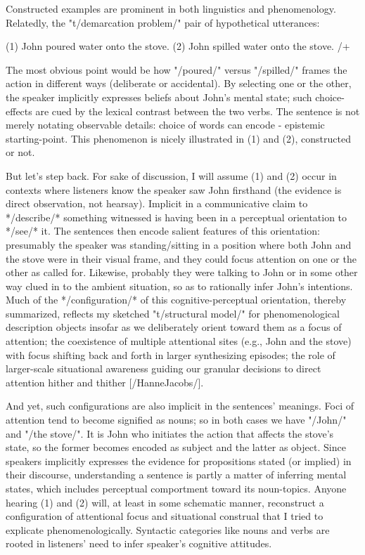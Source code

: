 Constructed examples are prominent in both linguistics 
and phenomenology.  Relatedly, the "t/demarcation problem/" 
pair of hypothetical utterances:

(1)  John poured water onto the stove.
(2)  John spilled water onto the stove.
/+

The most obvious point would be how "/poured/" versus "/spilled/" frames the 
action in different ways (deliberate or accidental).  By selecting 
one or the other, the speaker implicitly expresses beliefs about 
John's mental state; such choice-effects are cued by the lexical contrast 
between the two verbs.  The 
sentence is not merely notating observable details: choice of words can 
encode -%
epistemic starting-point.  This phenomenon 
is nicely illustrated in (1) and (2), constructed or not.  

But let's step back.  For sake of discussion, I will assume (1) and (2) 
occur in contexts where listeners know the speaker saw John firsthand 
(the evidence is direct observation, not hearsay).  Implicit 
in a communicative claim to */describe/* something witnessed 
is having been in a perceptual orientation to */see/* it.  The 
sentences then encode salient features of this orientation: 
presumably the speaker was standing/sitting in a position 
where both John and the stove were in their visual frame, 
and they could focus attention on one or the other as 
called for.  Likewise, probably they were talking to 
John or in some other way clued in to the ambient situation, so 
as to rationally infer John's intentions.  Much of the 
*/configuration/* of this cognitive-perceptual orientation, 
thereby summarized, reflects my sketched "t/structural model/" 
for phenomenological description %
objects insofar as we deliberately orient toward them 
as a focus of attention; the coexistence of multiple 
attentional sites (e.g., John and the stove) with focus 
shifting back and forth in larger synthesizing episodes; 
the role of larger-scale situational awareness guiding 
our granular decisions to direct attention hither and 
thither [/HanneJacobs/].

And yet, such configurations are also implicit in the 
sentences' meanings.  Foci of attention tend to become 
signified as nouns; so in both cases we have "/John/" and 
"/the stove/".  It is John who initiates the action that 
affects the stove's state, so the former becomes encoded 
as subject and the latter as object.  Since speakers 
implicitly expresses the evidence for propositions 
stated (or implied) in their discourse, understanding a 
sentence is partly a matter of inferring mental states, 
which includes perceptual comportment toward 
its noun-topics.  Anyone hearing (1) and (2) will, 
at least in some schematic manner, reconstruct a 
configuration of attentional focus and situational 
construal that I tried to explicate phenomenologically.
Syntactic categories like nouns and verbs are 
rooted in listeners' need to infer speaker's cognitive attitudes.

